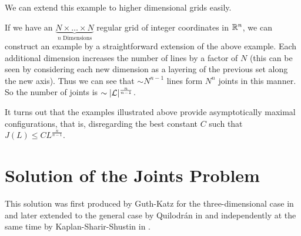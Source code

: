 We can extend this example to higher dimensional grids easily. 
\begin{example}
If we have an $\underbrace{N \times \dots \times N}_{n \text{ Dimensions}}$ regular grid of integer coordinates in $\mathbb R^n$, we can construct an example  by a straightforward extension
of the above example. Each additional dimension increases the number of lines by a factor of $N$ (this can be seen by considering each new dimension as a layering of the previous set along the new axis).
Thus we can see that $\sim N^{n-1}$ lines form $N^n$ joints in this manner. So the number of joints is $\sim |\mathcal L|^{\frac{n}{n-1}}$.
\end{example}

It turns out that the examples illustrated above provide asymptotically maximal configurations, that is, disregarding the best constant $C$ such that $J(L) \leq CL^{\frac{n}{n-1}}$.
\section{Solution of the Joints Problem}
This solution was first produced by Guth-Katz for the three-dimensional case in\cite{guth2008algebraic} and later extended to the general case by Quilodrán in \cite{quilodran2009joints} and independently at the same time by 
Kaplan-Sharir-Shustin in \cite{kaplan2009lines}.  


